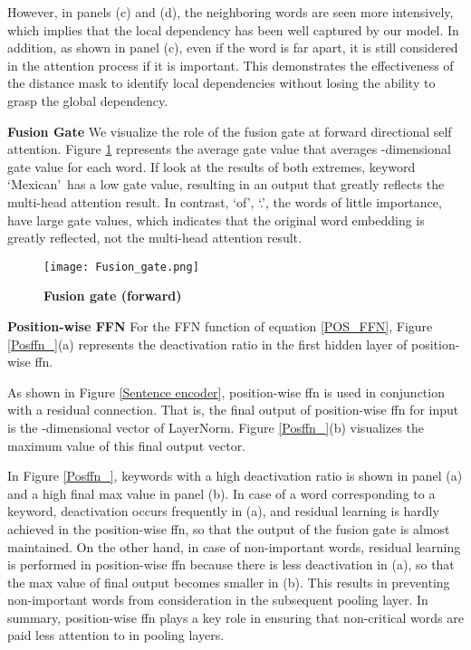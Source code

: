 \documentclass[11pt,letterpaper]{article}
\begin{document}
However, in panels (c) and (d), the neighboring words are seen more intensively, which implies that the local dependency has been well captured by our model. In addition, as shown in panel (c), even if the word is far apart, it is still considered in the attention process if it is important. This demonstrates the effectiveness of the distance mask to identify local dependencies without losing the ability to grasp the global dependency.

\textbf{Fusion Gate} We visualize the role of the fusion gate  at forward directional self attention. Figure \ref{forward_fusion_gate} represents the average gate value that averages -dimensional gate value for each word. If look at the results of both extremes, keyword \lq Mexican\rq \ has a low gate value, resulting in an output that greatly reflects the multi-head attention result. In contrast, \lq of\rq, \lq .\rq , the words of little importance, have large gate values, which indicates that the original word embedding is greatly reflected, not the multi-head attention result.

\begin{figure}[h]
\begin{center}
	\texttt{[image: Fusion\_gate.png]}
    
\caption{\textbf{Fusion gate (forward)}}
\label{forward_fusion_gate}
\end{center}
\end{figure}

\textbf{Position-wise FFN} For the FFN function of equation \ref{POS_FFN}, Figure \ref{Posffn_}(a) represents the deactivation ratio in the first hidden layer of position-wise ffn.

As shown in Figure \ref{Sentence encoder}, position-wise ffn is used in conjunction with a residual connection. That is, the final output of position-wise ffn for input  is the -dimensional vector of LayerNorm. Figure \ref{Posffn_}(b) visualizes the maximum value of this final output vector.

In Figure \ref{Posffn_}, keywords with a high deactivation ratio is shown in panel (a) and a high final max value in panel (b). In case of a word corresponding to a keyword, deactivation occurs frequently in (a), and residual learning is hardly achieved in the position-wise ffn, so that the output of the fusion gate is almost maintained. On the other hand, in case of non-important words, residual learning is performed in position-wise ffn because there is less deactivation in (a), so that the max value of final output becomes smaller in (b). This results in preventing non-important words from consideration in the subsequent pooling layer. In summary, position-wise ffn plays a key role in ensuring that non-critical words are paid less attention to in pooling layers.
\end{document}
